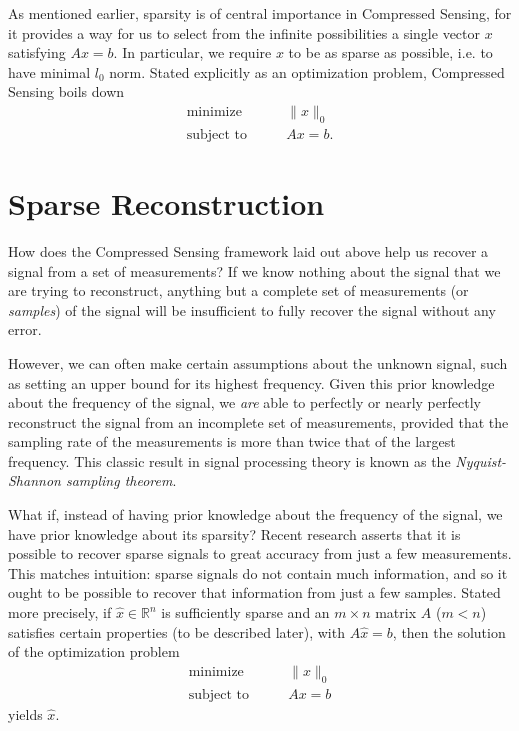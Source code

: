 As mentioned earlier, sparsity is of central importance in Compressed Sensing, for it provides a way for us to
select from the infinite possibilities a single vector $x$ satisfying $Ax = b$. In particular, we require $x$ to
be as sparse as possible, i.e. to have minimal $l_0$ norm. Stated explicitly as an optimization problem, Compressed
Sensing boils down
\begin{align*}
\text{minimize}\qquad &\|x\|_0\\
\text{subject to} \qquad &Ax = b.
\end{align*}

\section*{Sparse Reconstruction}
How does the Compressed Sensing framework laid out above help us recover a signal from a set of measurements?
If we know nothing about the signal that we are trying to reconstruct, anything but a complete set of measurements
(or \emph{samples}) of the signal will be insufficient to fully recover the signal without any error.

However, we can often make certain assumptions about the unknown signal, such as setting an upper bound for
its highest frequency. Given this prior knowledge about the frequency of the signal, we \emph{are} able to
perfectly or nearly perfectly reconstruct the signal from an incomplete set of measurements, provided that
the sampling rate of the measurements is more than twice that of the largest frequency. This classic result
in signal processing theory is known as the \emph{Nyquist-Shannon sampling theorem}.

What if, instead of having prior knowledge about the frequency of the signal, we have prior knowledge about
its sparsity? Recent research asserts that it is possible to recover sparse signals to great accuracy from just
a few measurements. This matches intuition: sparse signals do not contain much information, and so it ought to
be possible to recover that information from just a few samples. Stated more precisely, if $\hat{x} \in \mathbb{R}^n$
is sufficiently sparse and an $m \times n$ matrix $A$ ($m < n$) satisfies certain properties (to be described later),
with $A\hat{x} = b$, then the solution of the optimization problem
\begin{align*}
\text{minimize}\qquad &\|x\|_0\\
\text{subject to}\qquad &Ax = b
\end{align*}
yields $\hat{x}$.

